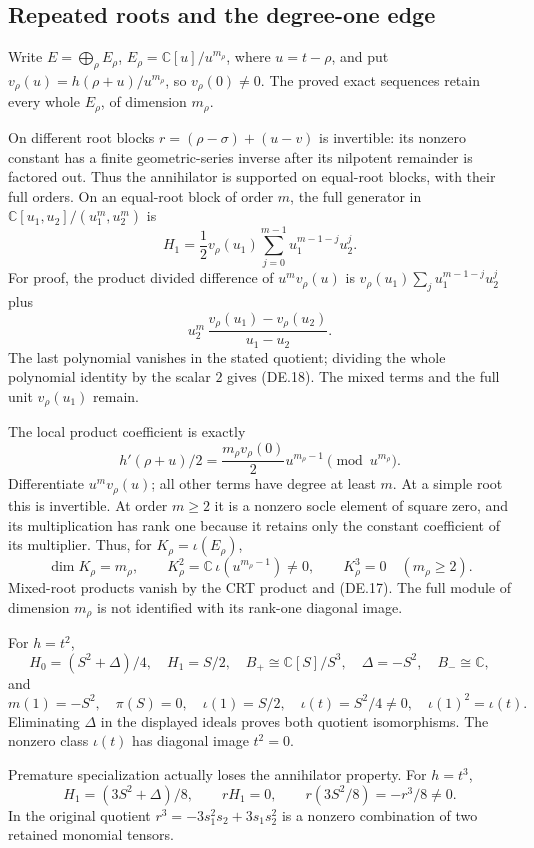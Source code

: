 \subsection{Repeated roots and the degree-one edge}

Write \(E=\bigoplus_\rho E_\rho\), \(E_\rho=\mathbb C[u]/u^{m_\rho}\), where \(u=t-\rho\), and put \(v_\rho(u)=h(\rho+u)/u^{m_\rho}\), so \(v_\rho(0)\ne0\). The proved exact sequences retain every whole \(E_\rho\), of dimension \(m_\rho\).

On different root blocks \(r=(\rho-\sigma)+(u-v)\) is invertible: its nonzero constant has a finite geometric-series inverse after its nilpotent remainder is factored out. Thus the annihilator is supported on equal-root blocks, with their full orders. On an equal-root block of order \(m\), the full generator in \(\mathbb C[u_1,u_2]/(u_1^m,u_2^m)\) is
\[
 H_1=\frac12v_\rho(u_1)\sum_{j=0}^{m-1}u_1^{m-1-j}u_2^j.
 \tag{DE.18}
\]
For proof, the product divided difference of \(u^mv_\rho(u)\) is \(v_\rho(u_1)\sum_j u_1^{m-1-j}u_2^j\) plus
\[
 u_2^m\,\frac{v_\rho(u_1)-v_\rho(u_2)}{u_1-u_2}.
\]
The last polynomial vanishes in the stated quotient; dividing the whole polynomial identity by the scalar \(2\) gives (DE.18). The mixed terms and the full unit \(v_\rho(u_1)\) remain.

The local product coefficient is exactly
\[
 h'(\rho+u)/2=\frac{m_\rho v_\rho(0)}2u^{m_\rho-1}
 \pmod{u^{m_\rho}}.
 \tag{DE.19}
\]
Differentiate \(u^mv_\rho(u)\); all other terms have degree at least \(m\). At a simple root this is invertible. At order \(m\ge2\) it is a nonzero socle element of square zero, and its multiplication has rank one because it retains only the constant coefficient of its multiplier. Thus, for \(K_\rho=\iota(E_\rho)\),
\[
 \dim K_\rho=m_\rho,\qquad
 K_\rho^2=\mathbb C\,\iota(u^{m_\rho-1})\ne0,\qquad
 K_\rho^3=0\quad(m_\rho\ge2).
 \tag{DE.20}
\]
Mixed-root products vanish by the CRT product and (DE.17). The full module of dimension \(m_\rho\) is not identified with its rank-one diagonal image.

For \(h=t^2\),
\[
 H_0=(S^2+\Delta)/4,\quad H_1=S/2,\quad
 B_+\cong\mathbb C[S]/S^3,\quad\Delta=-S^2,\quad B_-\cong\mathbb C,
\]
and
\[
 m(1)=-S^2,\quad\pi(S)=0,\quad
 \iota(1)=S/2,\quad\iota(t)=S^2/4\ne0,\quad\iota(1)^2=\iota(t).
 \tag{DE.21}
\]
Eliminating \(\Delta\) in the displayed ideals proves both quotient isomorphisms. The nonzero class \(\iota(t)\) has diagonal image \(t^2=0\).

Premature specialization actually loses the annihilator property. For \(h=t^3\),
\[
 H_1=(3S^2+\Delta)/8,\qquad rH_1=0,\qquad
 r(3S^2/8)=-r^3/8\ne0.
 \tag{DE.22}
\]
In the original quotient \(r^3=-3s_1^2s_2+3s_1s_2^2\) is a nonzero combination of two retained monomial tensors.

